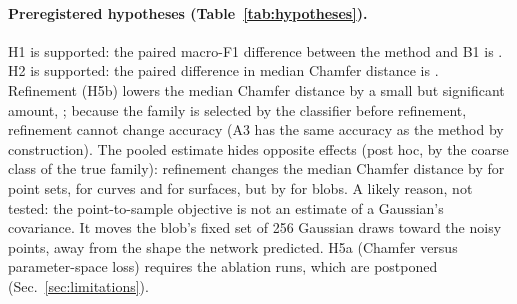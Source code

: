 \paragraph{Preregistered hypotheses (Table~\ref{tab:hypotheses}).} H1 is supported: the paired macro-F1 difference between the method and B1 is \estHone{} \ciHone{}. H2 is supported: the paired difference in median Chamfer distance is \estHtwo{} \ciHtwo{}. Refinement (H5b) lowers the median Chamfer distance by a small but significant amount, \estHfivebrefinement{} \ciHfivebrefinement{}; because the family is selected by the classifier before refinement, refinement cannot change accuracy (A3 has the same accuracy as the method by construction). The pooled estimate hides opposite effects (post hoc, by the coarse class of the true family): refinement changes the median Chamfer distance by   for point sets,   for curves and   for surfaces, but by   for blobs. A likely reason, not tested: the point-to-sample objective is not an estimate of a Gaussian's covariance. It moves the blob's fixed set of 256 Gaussian draws toward the noisy points, away from the shape the network predicted. H5a (Chamfer versus parameter-space loss) requires the ablation runs, which are postponed (Sec.~\ref{sec:limitations}).

\begin{table}[H]
\centering
\caption{Preregistered hypotheses and post-hoc checks. p-values of H1, H2 and H5b are Holm-corrected over these three synthetic comparisons (H1: normal approximation from the paired cluster-bootstrap standard error; H2, H5b: Wilcoxon signed-rank on per-chunk mean differences); ``$<$ 1e-16'' is a display floor. Rows marked post hoc are outside the Holm family. H3 uses the subsample-majority coarse label, an exact binomial CI and a 10{,}000-permutation null over predicted coarse labels.}
\label{tab:hypotheses}

\end{table}

